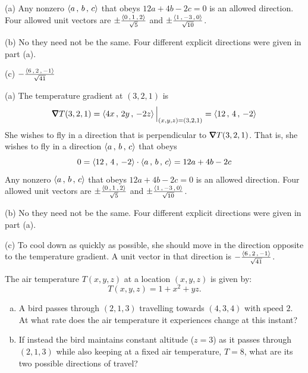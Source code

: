 %

\begin{answer}
(a) Any nonzero $\left< a\,,\,b\,,\,c\right>$ that obeys $12a+4b-2c=0$
is an allowed direction. Four allowed unit vectors are
$\pm\frac{\left< 0\,,\,1\,,\,2\right>}{\sqrt{5}}$ and
$\pm\frac{\left< 1\,,\,-3\,,\,0\right>}{\sqrt{10}}$.

(b) No they need not be the same. Four different explicit directions
     were given in part (a).

(c) $-\frac{\left< 6\,,\,2\,,\,-1\right>}{\sqrt{41}}$
\end{answer}

\begin{solution}
(a) The temperature gradient at $(3,2,1)$ is
\begin{align*}
\vnabla T(3,2,1) = \llt 4x\,,\,2y\,,\,-2z\rgt\Big|_{(x,y,z)=(3,2,1)}
                 = \llt 12\,,\,4\,,\,-2\rgt
\end{align*}
She wishes to fly in a direction that is perpendicular to $\vnabla T(3,2,1)$.
That is, she wishes to fly in a direction $\left< a\,,\,b\,,\,c\right>$
that obeys
\begin{equation*}
0 = \left< 12\,,\,4\,,\,-2\right>\cdot \left< a\,,\,b\,,\,c\right>
  = 12a+4b-2c
\end{equation*}
Any nonzero $\left< a\,,\,b\,,\,c\right>$ that obeys $12a+4b-2c=0$
is an allowed direction. Four allowed unit vectors are
$\pm\frac{\left< 0\,,\,1\,,\,2\right>}{\sqrt{5}}$ and
$\pm\frac{\left< 1\,,\,-3\,,\,0\right>}{\sqrt{10}}$.

(b) No they need not be the same. Four different explicit directions
     were given in part (a).

(c) To cool down as quickly as possible, she should move in the direction
    opposite to the temperature gradient. A unit vector in that direction is 
    $-\frac{\left< 6\,,\,2\,,\,-1\right>}{\sqrt{41}}$.
\end{solution}

\begin{question}[M200 2008D] %

\end{question}
The air temperature $T(x,y,z)$ at a location $(x,y,z)$ is given by:
\begin{equation*}
T(x,y,z) = 1 + x^2 + yz.
\end{equation*}
\begin{enumerate}[(a)]
\item
A bird passes through $(2,1,3)$ travelling towards $(4,3,4)$ with speed $2$.
At what rate does the air temperature it experiences change at this instant?

\item
If instead the bird maintains constant altitude ($z = 3$) as it passes
through $(2,1,3)$ while also keeping at a fixed air temperature, $T = 8$, 
what are its two possible directions of travel?
\end{enumerate}
%

